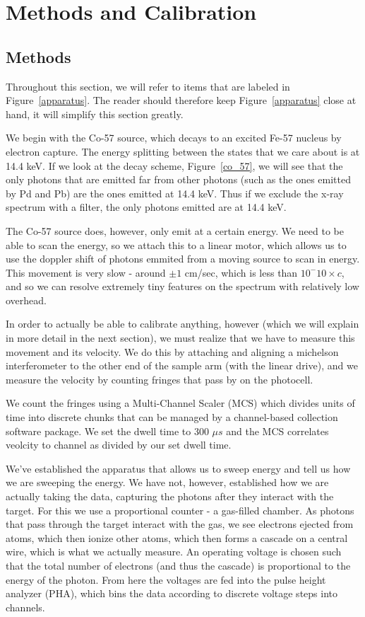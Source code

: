 \documentclass[reprint, nobibnotes, amssymb, amsmath, amsfonts, mathtools, mathrsfs, floatfix]{revtex4-1}
\begin{document}
    \section{Methods and Calibration}
      \subsection{Methods}
        Throughout this section, we will refer to items that are labeled in Figure~\ref{apparatus}.  The reader should therefore keep Figure~\ref{apparatus} close at hand, it will simplify this section greatly.

        We begin with the Co-57 source, which decays to an excited Fe-57 nucleus by electron capture.  The energy splitting between the states that we care about is at 14.4 keV.  If we look at the decay scheme, Figure~\ref{co_57}, we will see that the only photons that are emitted far from other photons (such as the ones emitted by Pd and Pb) are the ones emitted at 14.4 keV.  Thus if we exclude the x-ray spectrum with a filter, the only photons emitted are at 14.4 keV.

        The Co-57 source does, however, only emit at a certain energy.  We need to be able to scan the energy, so we attach this to a linear motor, which allows us to use the doppler shift of photons emmited from a moving source to scan in energy.  This movement is very slow - around $\pm1$ cm/sec, which is less than $10^-10 \times c$, and so we can resolve extremely tiny features on the spectrum with relatively low overhead.

        In order to actually be able to calibrate anything, however (which we will explain in more detail in the next section), we must realize that we have to measure this movement and its velocity.  We do this by attaching and aligning a michelson interferometer to the other end of the sample arm (with the linear drive), and we measure the velocity by counting fringes that pass by on the photocell.

        We count the fringes using a Multi-Channel Scaler (MCS) which divides units of time into discrete chunks that can be managed by a channel-based collection software package.  We set the dwell time to 300 $\mu s$ and the MCS correlates veolcity to channel as divided by our set dwell time.

        We've established the apparatus that allows us to sweep energy and tell us how we are sweeping the energy.  We have not, however, established how we are actually taking the data, capturing the photons after they interact with the target.  For this we use a proportional counter - a gas-filled chamber.  As photons that pass through the target interact with the gas, we see electrons ejected from atoms, which then ionize other atoms, which then forms a cascade on a central wire, which is what we actually measure.  An operating voltage is chosen such that the total number of electrons (and thus the cascade) is proportional to the energy of the photon.  From here the voltages are fed into the pulse height analyzer (PHA), which bins the data according to discrete voltage steps into channels.
\end{document}
